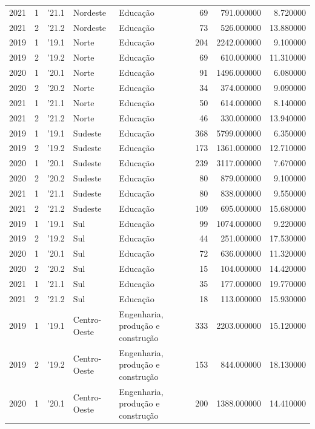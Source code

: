 \begin{longtable}{rrlllrrr}
2021 & 1 & '21.1 & Nordeste & Educação & 69 & 791.000000 & 8.720000 \\
2021 & 2 & '21.2 & Nordeste & Educação & 73 & 526.000000 & 13.880000 \\
2019 & 1 & '19.1 & Norte & Educação & 204 & 2242.000000 & 9.100000 \\
2019 & 2 & '19.2 & Norte & Educação & 69 & 610.000000 & 11.310000 \\
2020 & 1 & '20.1 & Norte & Educação & 91 & 1496.000000 & 6.080000 \\
2020 & 2 & '20.2 & Norte & Educação & 34 & 374.000000 & 9.090000 \\
2021 & 1 & '21.1 & Norte & Educação & 50 & 614.000000 & 8.140000 \\
2021 & 2 & '21.2 & Norte & Educação & 46 & 330.000000 & 13.940000 \\
2019 & 1 & '19.1 & Sudeste & Educação & 368 & 5799.000000 & 6.350000 \\
2019 & 2 & '19.2 & Sudeste & Educação & 173 & 1361.000000 & 12.710000 \\
2020 & 1 & '20.1 & Sudeste & Educação & 239 & 3117.000000 & 7.670000 \\
2020 & 2 & '20.2 & Sudeste & Educação & 80 & 879.000000 & 9.100000 \\
2021 & 1 & '21.1 & Sudeste & Educação & 80 & 838.000000 & 9.550000 \\
2021 & 2 & '21.2 & Sudeste & Educação & 109 & 695.000000 & 15.680000 \\
2019 & 1 & '19.1 & Sul & Educação & 99 & 1074.000000 & 9.220000 \\
2019 & 2 & '19.2 & Sul & Educação & 44 & 251.000000 & 17.530000 \\
2020 & 1 & '20.1 & Sul & Educação & 72 & 636.000000 & 11.320000 \\
2020 & 2 & '20.2 & Sul & Educação & 15 & 104.000000 & 14.420000 \\
2021 & 1 & '21.1 & Sul & Educação & 35 & 177.000000 & 19.770000 \\
2021 & 2 & '21.2 & Sul & Educação & 18 & 113.000000 & 15.930000 \\
2019 & 1 & '19.1 & Centro-Oeste & Engenharia, produção e construção & 333 & 2203.000000 & 15.120000 \\
2019 & 2 & '19.2 & Centro-Oeste & Engenharia, produção e construção & 153 & 844.000000 & 18.130000 \\
2020 & 1 & '20.1 & Centro-Oeste & Engenharia, produção e construção & 200 & 1388.000000 & 14.410000 \\

\end{longtable}
